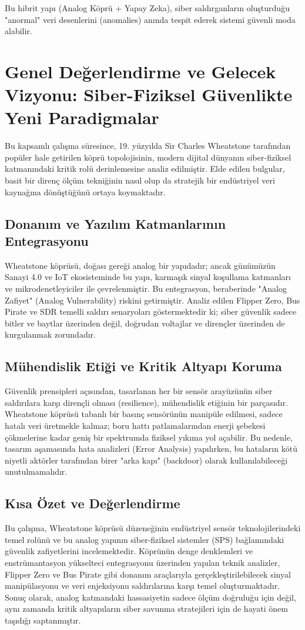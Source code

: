 \documentclass[12pt,a4paper]{article}
\begin{document}
Bu hibrit yapı (Analog Köprü + Yapay Zeka), siber saldırganların oluşturduğu "anormal" veri desenlerini (anomalies) anında tespit ederek sistemi güvenli moda alabilir.

\section{Genel Değerlendirme ve Gelecek Vizyonu: Siber-Fiziksel Güvenlikte Yeni Paradigmalar}

Bu kapsamlı çalışma süresince, 19. yüzyılda Sir Charles Wheatstone tarafından popüler hale getirilen köprü topolojisinin, modern dijital dünyanın siber-fiziksel katmanındaki kritik rolü derinlemesine analiz edilmiştir. Elde edilen bulgular, basit bir direnç ölçüm tekniğinin nasıl olup da stratejik bir endüstriyel veri kaynağına dönüştüğünü ortaya koymaktadır.

\subsection{Donanım ve Yazılım Katmanlarının Entegrasyonu}
Wheatstone köprüsü, doğası gereği analog bir yapıdadır; ancak günümüzün Sanayi 4.0 ve IoT ekosisteminde bu yapı, karmaşık sinyal koşullama katmanları ve mikrodenetleyiciler ile çevrelenmiştir. Bu entegrasyon, beraberinde "Analog Zafiyet" (Analog Vulnerability) riskini getirmiştir. Analiz edilen Flipper Zero, Bus Pirate ve SDR temelli saldırı senaryoları göstermektedir ki; siber güvenlik sadece bitler ve baytlar üzerinden değil, doğrudan voltajlar ve dirençler üzerinden de kurgulanmak zorundadır.

\subsection{Mühendislik Etiği ve Kritik Altyapı Koruma}
Güvenlik prensipleri açısından, tasarlanan her bir sensör arayüzünün siber saldırılara karşı dirençli olması (resilience), mühendislik etiğinin bir parçasıdır. Wheatstone köprüsü tabanlı bir basınç sensörünün manipüle edilmesi, sadece hatalı veri üretmekle kalmaz; boru hattı patlamalarından enerji şebekesi çökmelerine kadar geniş bir spektrumda fiziksel yıkıma yol açabilir. Bu nedenle, tasarım aşamasında hata analizleri (Error Analysis) yapılırken, bu hataların kötü niyetli aktörler tarafından birer "arka kapı" (backdoor) olarak kullanılabileceği unutulmamalıdır.

\subsection{Kısa Özet ve Değerlendirme}
Bu çalışma, Wheatstone köprüsü düzeneğinin endüstriyel sensör teknolojilerindeki temel rolünü ve bu analog yapının siber-fiziksel sistemler (SPS) bağlamındaki güvenlik zafiyetlerini incelemektedir. Köprünün denge denklemleri ve enstrümantasyon yükselteci entegrasyonu üzerinden yapılan teknik analizler, Flipper Zero ve Bus Pirate gibi donanım araçlarıyla gerçekleştirilebilecek sinyal manipülasyonu ve veri enjeksiyonu saldırılarına karşı temel oluşturmaktadır. Sonuç olarak, analog katmandaki hassasiyetin sadece ölçüm doğruluğu için değil, aynı zamanda kritik altyapıların siber savunma stratejileri için de hayati önem taşıdığı saptanmıştır.
\end{document}
